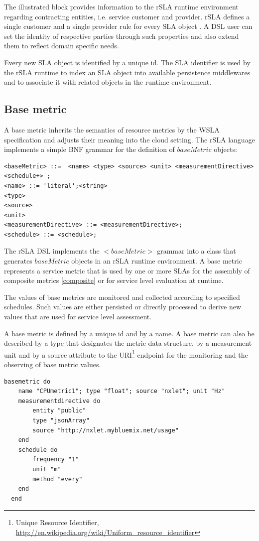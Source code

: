 \documentclass{llncs}
\begin{document}
The illustrated block provides information to the rSLA runtime environment regarding contracting entities, i.e. service customer and provider. rSLA defines a single customer and a single provider rule for every SLA object \cite{wsla}. A DSL user can set the identity of respective parties through such properties and also extend them to reflect domain specific needs.

Every new SLA object is identified by a unique id. The SLA identifier is used by the rSLA runtime to index an SLA object into available persistence middlewares and to associate it with related objects in the runtime environment. 

\subsection{Base metric}\label{basemetric}
A base metric inherits the semantics of resource metrics by the WSLA specification \cite{wsla} and adjusts their meaning into the cloud setting. The rSLA language implements a simple BNF grammar for the definition of $baseMetric$ objects:
\begin{lstlisting}[breaklines, firstnumber=auto, caption=$<BaseMetric>$ BNF grammar]
<baseMetric> ::=  <name> <type> <source> <unit> <measurementDirective> <schedule+> ;
<name> ::= 'literal';<string>
<type> 
<source> 
<unit>
<measurementDirective> ::= <measurementDirective>;
<schedule> ::= <schedule>;
\end{lstlisting}

The rSLA DSL implements the $<baseMetric>$ grammar into a class that generates $baseMetric$ objects in an rSLA runtime environment. A base metric represents a service metric that is used by one or more SLAs for the assembly of composite metrics \ref{composite} or for service level evaluation at runtime. 

The values of base metrics are monitored and collected according to specified schedules. Such values are either persisted or directly processed to derive new values that are used for service level assessment.

A base metric is defined by a unique id and by a name. A base metric can also be described by a type that designates the metric data structure, by a measurement unit and by a source attribute to the URI\footnote{Unique Resource Identifier, \url{http://en.wikipedia.org/wiki/Uniform_resource_identifier}} endpoint for the monitoring and the observing of base metric values. 

\begin{lstlisting}[breaklines, firstnumber=auto, caption=rSLA baseMetric definition, label=BMlst]
basemetric do
    name "CPUmetric1"; type "float"; source "nxlet"; unit "Hz"
    measurementdirective do
   		entity "public"
   		type "jsonArray"
   		source "http://nxlet.mybluemix.net/usage"
  	end
  	schedule do
    	frequency "1"
    	unit "m"
    	method "every"
  	end
  end
\end{lstlisting}
\end{document}
